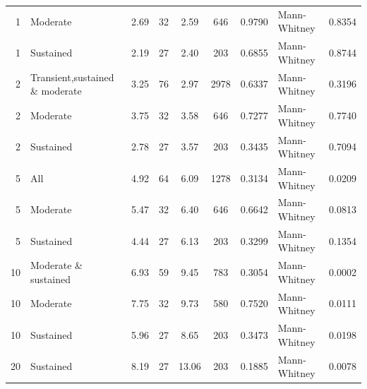 \begin{table}[H]
\begin{tabular}{r p{4cm} c c c c r l r}
1 & Moderate &  2.69 & 32 & 2.59 & 646 & 0.9790 &  Mann-Whitney & 0.8354 \\ 
1 & Sustained &  2.19 & 27 & 2.40 & 203 & 0.6855 &  Mann-Whitney & 0.8744 \\ 
2 & Transient,sustained \& moderate &  3.25 & 76 & 2.97 & 2978 & 0.6337 &  Mann-Whitney & 0.3196 \\ 
2 & Moderate &  3.75 & 32 & 3.58 & 646 & 0.7277 &  Mann-Whitney & 0.7740 \\ 
2 & Sustained &  2.78 & 27 & 3.57 & 203 & 0.3435 &  Mann-Whitney & 0.7094 \\ 
5 & All &  4.92 & 64 & 6.09 & 1278 & 0.3134 &  Mann-Whitney & 0.0209 \\ 
5 & Moderate &  5.47 & 32 & 6.40 & 646 & 0.6642 &  Mann-Whitney & 0.0813 \\ 
5 & Sustained &  4.44 & 27 & 6.13 & 203 & 0.3299 &  Mann-Whitney & 0.1354 \\ 
10 & Moderate \& sustained &  6.93 & 59 & 9.45 & 783 & 0.3054 &  Mann-Whitney & 0.0002 \\ 
10 & Moderate &  7.75 & 32 & 9.73 & 580 & 0.7520 &  Mann-Whitney & 0.0111 \\ 
10 & Sustained &  5.96 & 27 & 8.65 & 203 & 0.3473 &  Mann-Whitney & 0.0198 \\ 
20 & Sustained &  8.19 & 27 & 13.06 & 203 & 0.1885 &  Mann-Whitney & 0.0078 \\ 
\bottomrule
\end{tabular}%
\label{tab:codebase_graph_latex_repository_graph_component_time_series_statistical_significance_test_packagesnormal_previous} 
\end{table}
\newpage 

